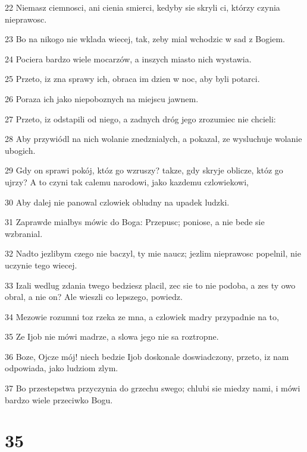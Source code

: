 \par 22 Niemasz ciemnosci, ani cienia smierci, kedyby sie skryli ci, którzy czynia nieprawosc.
\par 23 Bo na nikogo nie wklada wiecej, tak, zeby mial wchodzic w sad z Bogiem.
\par 24 Pociera bardzo wiele mocarzów, a inszych miasto nich wystawia.
\par 25 Przeto, iz zna sprawy ich, obraca im dzien w noc, aby byli potarci.
\par 26 Poraza ich jako niepoboznych na miejscu jawnem.
\par 27 Przeto, iz odstapili od niego, a zadnych dróg jego zrozumiec nie chcieli:
\par 28 Aby przywiódl na nich wolanie znedznialych, a pokazal, ze wysluchuje wolanie ubogich.
\par 29 Gdy on sprawi pokój, któz go wzruszy? takze, gdy skryje oblicze, któz go ujrzy? A to czyni tak calemu narodowi, jako kazdemu czlowiekowi,
\par 30 Aby dalej nie panowal czlowiek obludny na upadek ludzki.
\par 31 Zaprawde mialbys mówic do Boga: Przepusc; poniose, a nie bede sie wzbranial.
\par 32 Nadto jezlibym czego nie baczyl, ty mie naucz; jezlim nieprawosc popelnil, nie uczynie tego wiecej.
\par 33 Izali wedlug zdania twego bedziesz placil, zec sie to nie podoba, a zes ty owo obral, a nie on? Ale wieszli co lepszego, powiedz.
\par 34 Mezowie rozumni toz rzeka ze mna, a czlowiek madry przypadnie na to,
\par 35 Ze Ijob nie mówi madrze, a slowa jego nie sa roztropne.
\par 36 Boze, Ojcze mój! niech bedzie Ijob doskonale doswiadczony, przeto, iz nam odpowiada, jako ludziom zlym.
\par 37 Bo przestepstwa przyczynia do grzechu swego; chlubi sie miedzy nami, i mówi bardzo wiele przeciwko Bogu.

\chapter{35}

